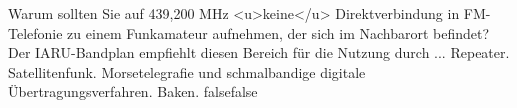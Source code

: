     {Warum sollten Sie auf 439,200 MHz <u>keine</u> Direktverbindung in FM-Telefonie zu einem Funkamateur aufnehmen, der sich im Nachbarort befindet? Der IARU-Bandplan empfiehlt diesen Bereich für die Nutzung durch ...}
    {Repeater.}
    {Satellitenfunk.}
    {Morsetelegrafie und schmalbandige digitale Übertragungsverfahren.}
    {Baken.}
    {false}{false}